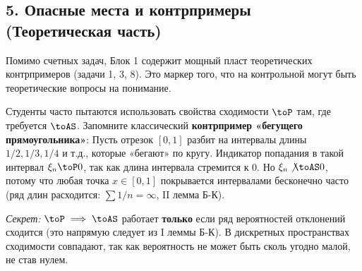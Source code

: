 \subsection*{5. Опасные места и контрпримеры (Теоретическая часть)}

Помимо счетных задач, Блок 1 содержит мощный пласт теоретических контрпримеров (задачи 1, 3, 8). Это маркер того, что на контрольной могут быть теоретические вопросы на понимание.

\begin{WarningBox}
Студенты часто пытаются использовать свойства сходимости $\toP$ там, где требуется $\toAS$. Запомните классический \textbf{контрпример «бегущего прямоугольника»}:
Пусть отрезок $[0, 1]$ разбит на интервалы длины $1/2, 1/3, 1/4$ и т.д., которые «бегают» по кругу. Индикатор попадания в такой интервал $\xi_n \toP 0$, так как длина интервала стремится к 0. Но $\xi_n \not\toAS 0$, потому что любая точка $x \in [0,1]$ покрывается интервалами бесконечно часто (ряд длин расходится: $\sum 1/n = \infty$, II лемма Б-К). 

\textit{Секрет:} $\toP \implies \toAS$ работает \textbf{только} если ряд вероятностей отклонений сходится (это напрямую следует из I леммы Б-К). В дискретных пространствах сходимости совпадают, так как вероятность не может быть сколь угодно малой, не став нулем.
\end{WarningBox}
